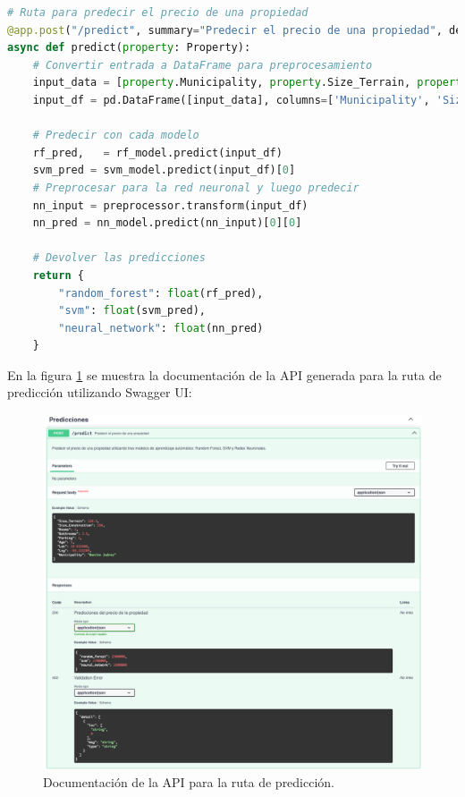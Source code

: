 \begin{lstlisting}[language=python, caption={Ruta de predicción}, label={lst:ruta-prediccion}]
# Ruta para predecir el precio de una propiedad
@app.post("/predict", summary="Predecir el precio de una propiedad", description="Predecir el precio de una propiedad utilizando tres modelos de aprendizaje automático: Random Forest, SVM y Redes Neuronales.", tags=["Predicciones"], response_description="Predicciones del precio de la propiedad", response_model=PredictResponse)
async def predict(property: Property):
    # Convertir entrada a DataFrame para preprocesamiento
    input_data = [property.Municipality, property.Size_Terrain, property.Size_Construction, property.Rooms, property.Bathrooms, property.Parking, property.Age, property.Lat, property.Lng]
    input_df = pd.DataFrame([input_data], columns=['Municipality', 'Size_Terrain', 'Size_Construction', 'Rooms', 'Bathrooms', 'Parking', 'Age', 'Lat', 'Lng'])

    # Predecir con cada modelo
    rf_pred,   = rf_model.predict(input_df)
    svm_pred = svm_model.predict(input_df)[0]
    # Preprocesar para la red neuronal y luego predecir
    nn_input = preprocessor.transform(input_df)
    nn_pred = nn_model.predict(nn_input)[0][0]

    # Devolver las predicciones
    return {
        "random_forest": float(rf_pred),
        "svm": float(svm_pred),
        "neural_network": float(nn_pred)
    }
\end{lstlisting}

En la figura \ref{fig:api-prediccion} se muestra la documentación de la API generada
para la ruta de predicción utilizando Swagger UI:

\begin{figure}[H]
    \centering
    \includegraphics[width=1.0\textwidth]{imagenes/05-implementacion/servicio-web/api-prediccion.png}
    \caption{Documentación de la API para la ruta de predicción.}
    \label{fig:api-prediccion}
\end{figure}

